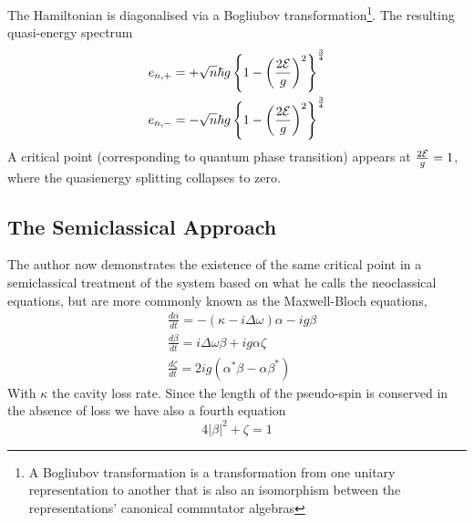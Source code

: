 The Hamiltonian is diagonalised via a Bogliubov transformation\footnote{A Bogliubov transformation is a transformation from one unitary representation to another that is also an isomorphism between the representations' canonical commutator algebras}. The resulting quasi-energy spectrum
\begin{align}
	e_{n, +} &= + \sqrt{n} \hbar g \left \{1 - \left ({\frac{2\mathcal{E}}{g}} \right )^2 \right \}^{\frac{3}{4}} \\
	e_{n, -} &= - \sqrt{n} \hbar g \left \{1 - \left ({\frac{2\mathcal{E}}{g}} \right )^2 \right \}^{\frac{3}{4}}
\end{align}
A critical point (corresponding to quantum phase transition) appears at $\frac{2\mathcal{E}}{g} = 1$, where the quasienergy splitting collapses to zero.
\subsection{The Semiclassical Approach}

The author now demonstrates the existence of the same critical point in a semiclassical treatment of the system based on what he calls the neoclassical equations, but are more commonly known as the Maxwell-Bloch equations, 
\begin{align}
	&\frac{d \alpha}{dt} = -(\kappa -i \Delta \omega) \alpha-ig \beta \label{eq:alpha}\\
	&\frac{d \beta}{dt} = i \Delta \omega \beta +ig \alpha \zeta \label{eq:beta}\\	
	&\frac{d \zeta}{dt} = 2 i g(\alpha^* \beta -\alpha \beta^*)\label{eq:zeta}
\end{align}
With $\kappa$ the cavity loss rate. Since the length of the pseudo-spin is conserved in the absence of loss we have also a fourth equation
\begin{equation}
	4|\beta|^2+\zeta = 1 \label{eq:pseudospin}
\end{equation}
